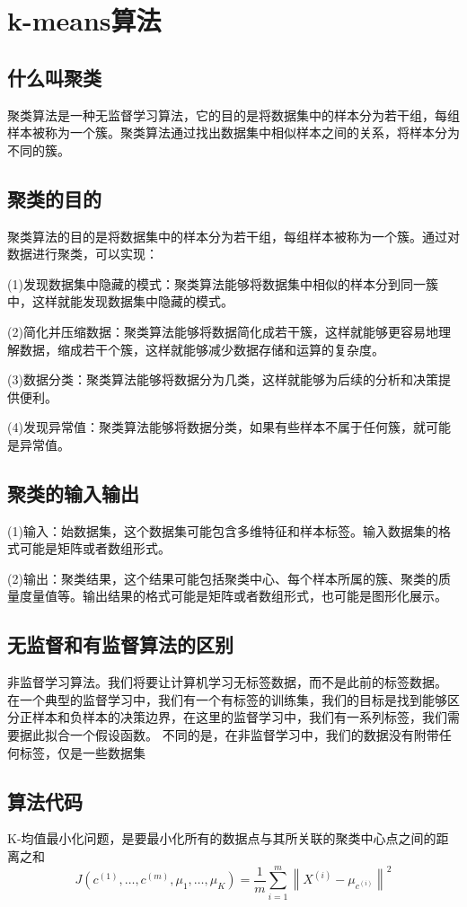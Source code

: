 \documentclass[supercite]{Experimental_Report}
\theoremstyle{definition}
\begin{document}
\section{k-means算法}
\subsection{什么叫聚类}
聚类算法是一种无监督学习算法，它的目的是将数据集中的样本分为若干组，每组样本被称为一个簇。聚类算法通过找出数据集中相似样本之间的关系，将样本分为不同的簇。
\subsection{聚类的目的}
聚类算法的目的是将数据集中的样本分为若干组，每组样本被称为一个簇。通过对数据进行聚类，可以实现：

(1)发现数据集中隐藏的模式：聚类算法能够将数据集中相似的样本分到同一簇中，这样就能发现数据集中隐藏的模式。

(2)简化并压缩数据：聚类算法能够将数据简化成若干簇，这样就能够更容易地理解数据，缩成若干个簇，这样就能够减少数据存储和运算的复杂度。

(3)数据分类：聚类算法能够将数据分为几类，这样就能够为后续的分析和决策提供便利。

(4)发现异常值：聚类算法能够将数据分类，如果有些样本不属于任何簇，就可能是异常值。

\subsection{聚类的输入输出}
(1)输入：始数据集，这个数据集可能包含多维特征和样本标签。输入数据集的格式可能是矩阵或者数组形式。

(2)输出：聚类结果，这个结果可能包括聚类中心、每个样本所属的簇、聚类的质量度量值等。输出结果的格式可能是矩阵或者数组形式，也可能是图形化展示。
\subsection{无监督和有监督算法的区别}
非监督学习算法。我们将要让计算机学习无标签数据，而不是此前的标签数据。
在一个典型的监督学习中，我们有一个有标签的训练集，我们的目标是找到能够区分正样本和负样本的决策边界，在这里的监督学习中，我们有一系列标签，我们需要据此拟合一个假设函数。
不同的是，在非监督学习中，我们的数据没有附带任何标签，仅是一些数据集
\subsection{算法代码}
K-均值最小化问题，是要最小化所有的数据点与其所关联的聚类中心点之间的距离之和
$$
J\left(c^{(1)}, \ldots, c^{(m)}, \mu_{1}, \ldots, \mu_{K}\right)=\frac{1}{m} \sum_{i=1}^{m}\left\|X^{(i)}-\mu_{c^{(i)}}\right\|^{2}
$$
\end{document}
